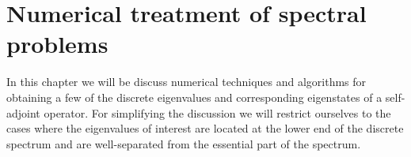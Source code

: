 \chapter{Numerical treatment of spectral problems}
\label{ch:numeigen}


In this chapter we will be discuss numerical techniques
and algorithms for obtaining a few of the discrete
eigenvalues and corresponding eigenstates
of a self-adjoint operator.
For simplifying the discussion we will restrict ourselves
to the cases where the eigenvalues of interest
are located at the lower end of the discrete spectrum
and are well-separated from the essential part of the spectrum.



